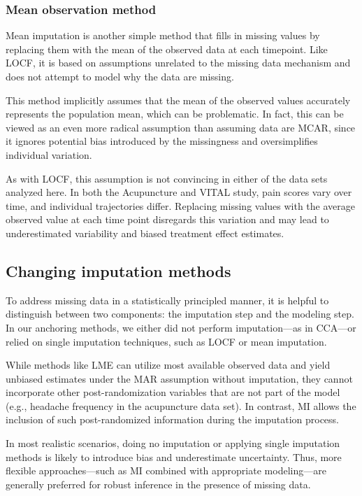 \documentclass{article}
\begin{document}
\subsubsection{Mean observation method}\label{mean-observation-method}

Mean imputation is another simple method that fills in missing values by
replacing them with the mean of the observed data at each timepoint.
Like LOCF, it is based on assumptions unrelated to the missing data
mechanism and does not attempt to model why the data are missing.

This method implicitly assumes that the mean of the observed values
accurately represents the population mean, which can be problematic. In
fact, this can be viewed as an even more radical assumption than
assuming data are MCAR, since it ignores potential bias introduced by
the missingness and oversimplifies individual variation.

As with LOCF, this assumption is not convincing in either of the data
sets analyzed here. In both the Acupuncture and VITAL study, pain scores
vary over time, and individual trajectories differ. Replacing missing
values with the average observed value at each time point disregards
this variation and may lead to underestimated variability and biased
treatment effect estimates.

\subsection{Changing imputation
methods}\label{changing-imputation-methods}

To address missing data in a statistically principled manner, it is
helpful to distinguish between two components: the imputation step and
the modeling step. In our anchoring methods, we either did not perform
imputation---as in CCA---or relied on single imputation techniques, such
as LOCF or mean imputation.

While methods like LME can utilize most available observed data and
yield unbiased estimates under the MAR assumption without imputation,
they cannot incorporate other post-randomization variables that are not
part of the model (e.g., headache frequency in the acupuncture data
set). In contrast, MI allows the inclusion of such post-randomized
information during the imputation process.

In most realistic scenarios, doing no imputation or applying single
imputation methods is likely to introduce bias and underestimate
uncertainty. Thus, more flexible approaches---such as MI combined with
appropriate modeling---are generally preferred for robust inference in
the presence of missing data.
\end{document}
